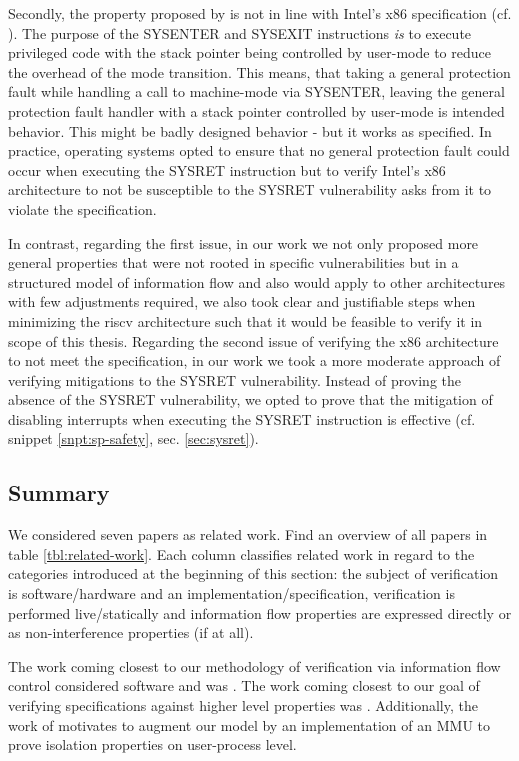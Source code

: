 Secondly, the property proposed by \citeauthor{BradfieldS16} is not in line with Intel's x86 specification (cf. \cite{Dunlap19}).
The purpose of the SYSENTER and SYSEXIT instructions \textit{is} to execute privileged code with the stack pointer being controlled by user-mode to reduce the overhead of the mode transition.
This means, that taking a general protection fault while handling a call to machine-mode via SYSENTER, leaving the general protection fault handler with a stack pointer controlled by user-mode is intended behavior.
This might be badly designed behavior - but it works as specified.
In practice, operating systems opted to ensure that no general protection fault could occur when executing the SYSRET instruction but to verify Intel's x86 architecture to not be susceptible to the SYSRET vulnerability asks from it to violate the specification.

In contrast, regarding the first issue, in our work we not only proposed more general properties that were not rooted in specific vulnerabilities but in a structured model of information flow and also would apply to other architectures with few adjustments required, we also took clear and justifiable steps when minimizing the \gls{riscv} architecture such that it would be feasible to verify it in scope of this thesis.
Regarding the second issue of verifying the x86 architecture to not meet the specification, in our work we took a more moderate approach of verifying mitigations to the SYSRET vulnerability.
Instead of proving the absence of the SYSRET vulnerability, we opted to prove that the mitigation of disabling interrupts when executing the SYSRET instruction is effective (cf. snippet \ref{snpt:sp-safety}, sec. \ref{sec:sysret}).

\subsection{Summary}

We considered seven papers as related work.
Find an overview of all papers in table \ref{tbl:related-work}.
Each column classifies related work in regard to the categories introduced at the beginning of this section: the subject of verification is software/hardware and an implementation/specification, verification is performed live/statically and information flow properties are expressed directly or as non-interference properties (if at all).

The work coming closest to our methodology of verification via information flow control considered software and was \cite{GordonKPGNR15,SuhLZD04}.
The work coming closest to our goal of verifying specifications against higher level properties was \cite{Fox02,KhakpourSD13,BradfieldS16}.
Additionally, the work of \cite{SuhLZD04,KhakpourSD13} motivates to augment our model by an implementation of an MMU to prove isolation properties on user-process level.

